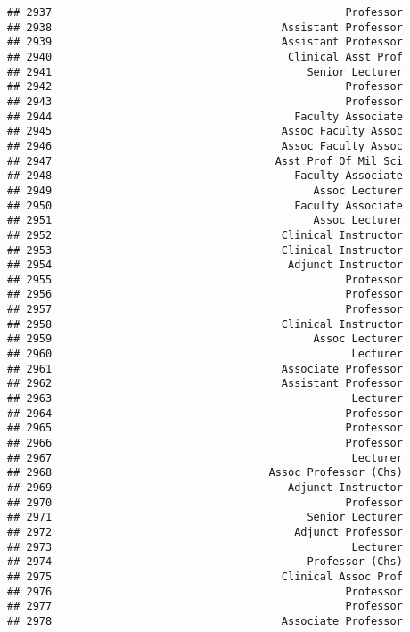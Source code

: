 \documentclass[
]{article}
\begin{document}
\begin{verbatim}
## 2937                                              Professor
## 2938                                    Assistant Professor
## 2939                                    Assistant Professor
## 2940                                     Clinical Asst Prof
## 2941                                        Senior Lecturer
## 2942                                              Professor
## 2943                                              Professor
## 2944                                      Faculty Associate
## 2945                                    Assoc Faculty Assoc
## 2946                                    Assoc Faculty Assoc
## 2947                                   Asst Prof Of Mil Sci
## 2948                                      Faculty Associate
## 2949                                         Assoc Lecturer
## 2950                                      Faculty Associate
## 2951                                         Assoc Lecturer
## 2952                                    Clinical Instructor
## 2953                                    Clinical Instructor
## 2954                                     Adjunct Instructor
## 2955                                              Professor
## 2956                                              Professor
## 2957                                              Professor
## 2958                                    Clinical Instructor
## 2959                                         Assoc Lecturer
## 2960                                               Lecturer
## 2961                                    Associate Professor
## 2962                                    Assistant Professor
## 2963                                               Lecturer
## 2964                                              Professor
## 2965                                              Professor
## 2966                                              Professor
## 2967                                               Lecturer
## 2968                                  Assoc Professor (Chs)
## 2969                                     Adjunct Instructor
## 2970                                              Professor
## 2971                                        Senior Lecturer
## 2972                                      Adjunct Professor
## 2973                                               Lecturer
## 2974                                        Professor (Chs)
## 2975                                    Clinical Assoc Prof
## 2976                                              Professor
## 2977                                              Professor
## 2978                                    Associate Professor

\end{verbatim}
\end{document}
